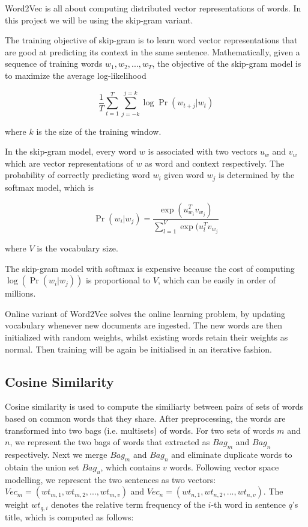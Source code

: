 \documentclass[journal,12pt,onecolumn,draftclsnofoot,]{IEEEtran}
\begin{document}
Word2Vec is all about computing distributed vector representations of words. In this project we will be using the skip-gram variant. 


The training objective of skip-gram is to learn word vector representations that are good at predicting its context in the same sentence. Mathematically, given a sequence of training words $w_1,w_2,...,w_T$, the objective of the skip-gram model is to maximize the average log-likelihood

$$ \frac{1}{T}\sum_{t=1}^T\sum_{j=-k}^{j=k} \log \Pr(w_{t+j} | w_t) $$

where $k$ is the size of the training window. 

In the skip-gram model, every word $w$ is associated with two vectors $u_w$ and $v_w$ which are vector representations of $w$ as word and context respectively. The probability of correctly predicting word $w_i$ given word $w_j$ is determined by the softmax model, which is

$$ \Pr (w_i | w_j) = \frac{\exp(u_{w_i}^T v_{w_j})}{\sum_{l=1}^V \exp(u_l^T v_{w_j}} $$

where $V$ is the vocabulary size. 

The skip-gram model with softmax is expensive because the cost of computing $\log (\Pr(w_i | w_j))$ is proportional to $V$, which can be easily in order of millions.%


Online variant of Word2Vec solves the online learning problem, by updating vocabulary whenever new documents are ingested. The new words are then initialized with random weights, whilst existing words retain their weights as normal. Then training will be again be initialised in an iterative fashion. %


\subsection{Cosine Similarity}


Cosine similarity is used to compute the similiarty between pairs of sets of words based on common words that they share. After preprocessing, the words are transformed into two bags (i.e. multisets) of words. For two sets of words $m$ and $n$, we represent the two bags of words that extracted as $Bag_m$ and $Bag_n$ respectively. Next we merge $Bag_m$ and $Bag_n$ and eliminate duplicate words to obtain the union set $Bag_u$, which contains $v$ words.  Following vector space modelling, we represent the two sentences as two vectors: $Vec_m = (wt_{m,1}, wt_{m, 2}, ..., wt_{m, v})$ and $Vec_n = (wt_{n,1}, wt_{n, 2}, ..., wt_{n, v})$. The weight $wt_{q, i}$  denotes the relative term frequency of the $i$-th word in sentence $q$'s title, which is computed as follows:
\end{document}
